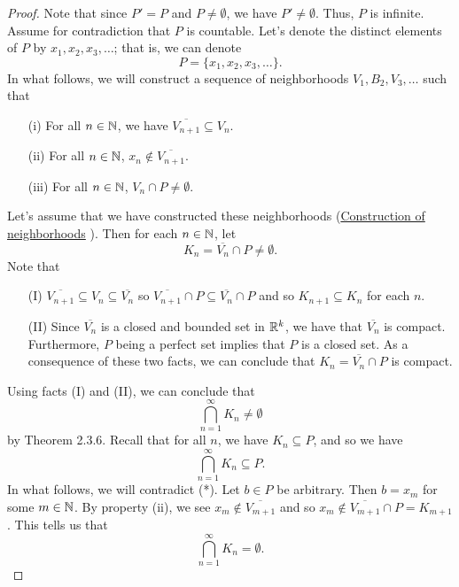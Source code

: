\documentclass[a4paper]{report}
\begin{document}
\begin{proof}
    Note that since \( P' = P  \) and \( P \neq \emptyset \), we have \( P' \neq \emptyset \). Thus, \( P  \) is infinite. Assume for contradiction that \( P  \) is countable. Let's denote the distinct elements of \( P  \) by \( {x}_{1}, {x}_{2}, {x}_{3}, \dots \); that is, we can denote  
    \[  P = \{ {x}_{1}, {x}_{2}, {x}_{3}, \dots \}. \]
    In what follows, we will construct a sequence of neighborhoods \( {V}_{1}, {B}_{2}, {V}_{3}, \dots  \) such that
    \begin{enumerate}
        \item[(i)] For all \( n \in \mathbb{N}  \), we have \( \overline{{V}_{n+1}} \subseteq  {V}_{n} \).
        \item[(ii)] For all \( n \in \mathbb{N}  \), \( {x}_{n} \notin \overline{{V}_{n+1}} \).
        \item[(iii)] For all \( n \in \mathbb{N}  \), \( {V}_{n} \cap P \neq \emptyset \).
    \end{enumerate}
    Let's assume that we have constructed these neighborhoods ({\hyperref[Construction of neighborhoods]{Construction of neighborhoods}} ). Then for each \( n \in \mathbb{N}  \), let 
    \[  {K}_{n} = \overline{{V}_{n}} \cap P \neq \emptyset. \]
   Note that  
   \begin{enumerate}
       \item[(I)] \( \overline{{V}_{n+1}} \subseteq  {V}_{n} \subseteq \overline{{V}_{n}} \) so \( \overline{{V}_{n+1}} \cap P \subseteq  \overline{{V}_{n}} \cap P  \) and so \( {K}_{n+1} \subseteq  {K}_{n} \) for each \( n  \). 
        \item[(II)] Since \( \overline{{V}_{n}} \) is a closed and bounded set in \( \mathbb{R}^{k} \), we have that \( \overline{{V}_{n}} \) is compact. Furthermore, \( P \) being a perfect set implies that \( P \) is a closed set. As a consequence of these two facts, we can conclude that \( {K}_{n} = \overline{{V}_{n}} \cap P  \) is compact. 
   \end{enumerate}
   Using facts (I) and (II), we can conclude that 
   \[  \bigcap_{ n=1  }^{ \infty    } {K}_{n} \neq \emptyset \tag{*} \]
   by Theorem 2.3.6. Recall that for all \( n  \), we have \( {K}_{n} \subseteq  P  \), and so we have 
   \[  \bigcap_{ n = 1  }^{ \infty  } {K}_{n} \subseteq P. \]
   In what follows, we will contradict (*). Let \( b \in P  \) be arbitrary. Then \( b = {x}_{m} \) for some \( m \in \mathbb{N}  \). By property (ii), we see \( {x}_{m} \notin \overline{{V}_{m+1}} \) and so \( {x}_{m} \notin \overline{{V}_{m+1}} \cap P = {K}_{m+1}  \). This tells us that 
   \[  \bigcap_{ n = 1  }^{ \infty  }  {K}_{n} = \emptyset.  \]
\end{proof}
\end{document}
